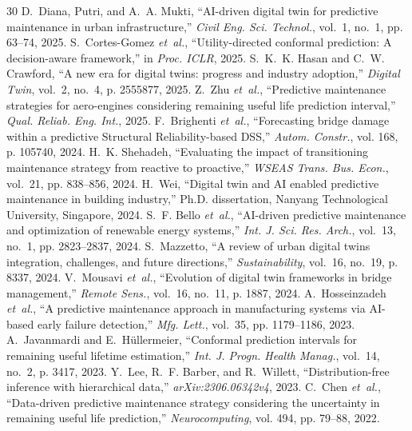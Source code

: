 \documentclass[conference,a4paper]{IEEEtran}
\begin{document}
\begin{thebibliography}{30}
D.~Diana, Putri, and A.~A. Mukti, ``AI-driven digital twin for predictive maintenance in urban infrastructure,'' \emph{Civil Eng. Sci. Technol.}, vol.~1, no.~1, pp. 63--74, 2025.
S.~Cortes-Gomez \emph{et~al.}, ``Utility-directed conformal prediction: A decision-aware framework,'' in \emph{Proc. ICLR}, 2025.
S.~K.~K. Hasan and C.~W. Crawford, ``A new era for digital twins: progress and industry adoption,'' \emph{Digital Twin}, vol.~2, no.~4, p. 2555877, 2025.
Z.~Zhu \emph{et~al.}, ``Predictive maintenance strategies for aero-engines considering remaining useful life prediction interval,'' \emph{Qual. Reliab. Eng. Int.}, 2025.
F.~Brighenti \emph{et~al.}, ``Forecasting bridge damage within a predictive Structural Reliability-based DSS,'' \emph{Autom. Constr.}, vol. 168, p. 105740, 2024.
H.~K. Shehadeh, ``Evaluating the impact of transitioning maintenance strategy from reactive to proactive,'' \emph{WSEAS Trans. Bus. Econ.}, vol.~21, pp. 838--856, 2024.
H.~Wei, ``Digital twin and AI enabled predictive maintenance in building industry,'' Ph.D. dissertation, Nanyang Technological University, Singapore, 2024.
S.~F. Bello \emph{et~al.}, ``AI-driven predictive maintenance and optimization of renewable energy systems,'' \emph{Int. J. Sci. Res. Arch.}, vol.~13, no.~1, pp. 2823--2837, 2024.
S.~Mazzetto, ``A review of urban digital twins integration, challenges, and future directions,'' \emph{Sustainability}, vol.~16, no.~19, p. 8337, 2024.
V.~Mousavi \emph{et~al.}, ``Evolution of digital twin frameworks in bridge management,'' \emph{Remote Sens.}, vol.~16, no.~11, p. 1887, 2024.
A.~Hosseinzadeh \emph{et~al.}, ``A predictive maintenance approach in manufacturing systems via AI-based early failure detection,'' \emph{Mfg. Lett.}, vol.~35, pp. 1179--1186, 2023.
A.~Javanmardi and E.~H{\"u}llermeier, ``Conformal prediction intervals for remaining useful lifetime estimation,'' \emph{Int. J. Progn. Health Manag.}, vol.~14, no.~2, p. 3417, 2023.
Y.~Lee, R.~F. Barber, and R.~Willett, ``Distribution-free inference with hierarchical data,'' \emph{arXiv:2306.06342v4}, 2023.
C.~Chen \emph{et~al.}, ``Data-driven predictive maintenance strategy considering the uncertainty in remaining useful life prediction,'' \emph{Neurocomputing}, vol. 494, pp. 79--88, 2022.

\end{thebibliography}
\end{document}
